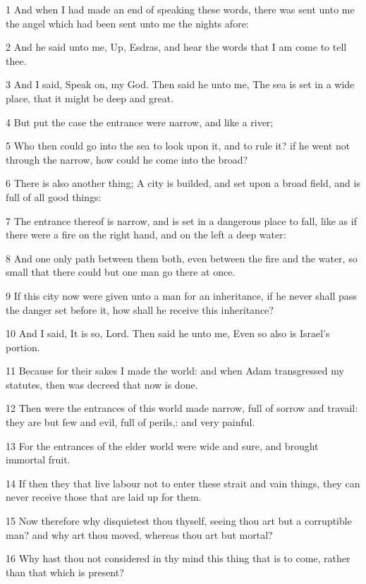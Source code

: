 \par 1 And when I had made an end of speaking these words, there was sent unto me the angel which had been sent unto me the nights afore:
\par 2 And he said unto me, Up, Esdras, and hear the words that I am come to tell thee.
\par 3 And I said, Speak on, my God. Then said he unto me, The sea is set in a wide place, that it might be deep and great.
\par 4 But put the case the entrance were narrow, and like a river;
\par 5 Who then could go into the sea to look upon it, and to rule it? if he went not through the narrow, how could he come into the broad?
\par 6 There is also another thing; A city is builded, and set upon a broad field, and is full of all good things:
\par 7 The entrance thereof is narrow, and is set in a dangerous place to fall, like as if there were a fire on the right hand, and on the left a deep water:
\par 8 And one only path between them both, even between the fire and the water, so small that there could but one man go there at once.
\par 9 If this city now were given unto a man for an inheritance, if he never shall pass the danger set before it, how shall he receive this inheritance?
\par 10 And I said, It is so, Lord. Then said he unto me, Even so also is Israel's portion.
\par 11 Because for their sakes I made the world: and when Adam transgressed my statutes, then was decreed that now is done.
\par 12 Then were the entrances of this world made narrow, full of sorrow and travail: they are but few and evil, full of perils,: and very painful.
\par 13 For the entrances of the elder world were wide and sure, and brought immortal fruit.
\par 14 If then they that live labour not to enter these strait and vain things, they can never receive those that are laid up for them.
\par 15 Now therefore why disquietest thou thyself, seeing thou art but a corruptible man? and why art thou moved, whereas thou art but mortal?
\par 16 Why hast thou not considered in thy mind this thing that is to come, rather than that which is present?
